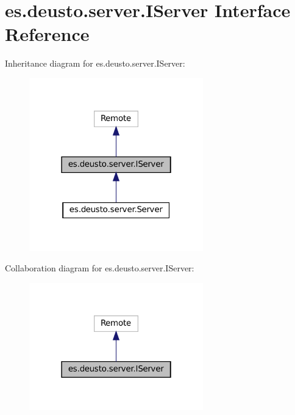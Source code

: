 \hypertarget{interfacees_1_1deusto_1_1server_1_1_i_server}{}\section{es.\+deusto.\+server.\+I\+Server Interface Reference}
\label{interfacees_1_1deusto_1_1server_1_1_i_server}


Inheritance diagram for es.\+deusto.\+server.\+I\+Server\+:\nopagebreak
\begin{figure}[H]
\begin{center}
\leavevmode
\includegraphics[width=214pt]{interfacees_1_1deusto_1_1server_1_1_i_server__inherit__graph}
\end{center}
\end{figure}


Collaboration diagram for es.\+deusto.\+server.\+I\+Server\+:\nopagebreak
\begin{figure}[H]
\begin{center}
\leavevmode
\includegraphics[width=214pt]{interfacees_1_1deusto_1_1server_1_1_i_server__coll__graph}
\end{center}
\end{figure}

